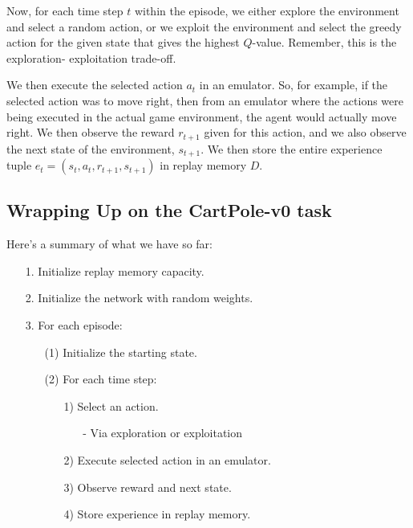 Now, for each time step $t$ within the episode, we either explore the environment and 
select a random action, or we exploit the environment and select the greedy action for 
the given state that gives the highest $Q$-value. Remember, this is the exploration-
exploitation trade-off.

We then execute the selected action $a_t$ in an emulator. So, for example, if the 
selected action was to move right, then from an emulator where the actions were being 
executed in the actual game environment, the agent would actually move right. We then 
observe the reward $r_{t+1}$ given for this action, and we also observe the next state 
of the environment, $s_{t+1}$. We then store the entire experience tuple 
$e_t = (s_t, a_t, r_{t+1}, s_{t+1})$ in replay memory $D$.


\subsection{Wrapping Up on the CartPole-v0 task}

Here's a summary of what we have so far:

\begin{itemize}
\setlength{\parskip}{0pt}
\item[1.]
Initialize replay memory capacity.

\item[2.]
Initialize the network with random weights.

\item[3.]
For each episode:
	\begin{itemize}
	\item[(1)]
	Initialize the starting state.

	\item[(2)]
	For each time step:
		\begin{itemize}
		\item[1)]
		Select an action.
			\begin{itemize}
			\item[-]
			Via exploration or exploitation
			\end{itemize}

		\item[2)]
		Execute selected action in an emulator.

		\item[3)]
		Observe reward and next state.

		\item[4)]
		Store experience in replay memory.
		\end{itemize}
	\end{itemize}
\end{itemize}

